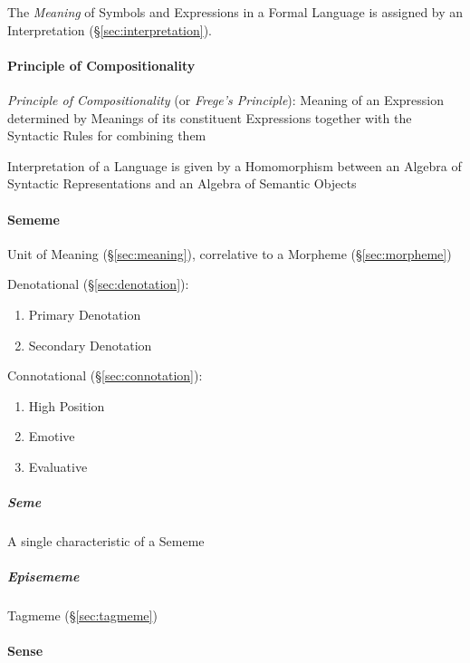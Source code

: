 The \emph{Meaning} of Symbols and Expressions in a Formal Language is
assigned by an Interpretation (\S\ref{sec:interpretation}).



\paragraph{Principle of Compositionality}\label{sec:compositionality}
\hfill

\emph{Principle of Compositionality} (or \emph{Frege's Principle}):
Meaning of an Expression determined by Meanings of its constituent
Expressions together with the Syntactic Rules for combining them

Interpretation of a Language is given by a Homomorphism between an
Algebra of Syntactic Representations and an Algebra of Semantic
Objects



\paragraph{Sememe}\label{sec:sememe}\hfill

Unit of Meaning (\S\ref{sec:meaning}), correlative to a Morpheme
(\S\ref{sec:morpheme})

Denotational (\S\ref{sec:denotation}):

\begin{enumerate}
  \item Primary Denotation
  \item Secondary Denotation
\end{enumerate}

Connotational (\S\ref{sec:connotation}):

\begin{enumerate}
  \item High Position
  \item Emotive
  \item Evaluative
\end{enumerate}



\subparagraph{Seme}\label{sec:seme}\hfill

A single characteristic of a Sememe



\subparagraph{Episememe}\label{sec:episememe}\hfill

Tagmeme (\S\ref{sec:tagmeme})



\paragraph{Sense}\label{sec:sense}\hfill
\cite{chalmers02}

